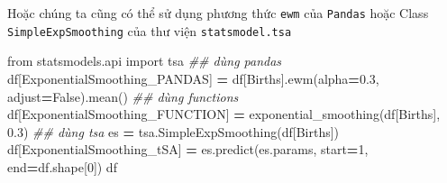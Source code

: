 \documentclass[
]{book}
\newenvironment{Shaded}{\begin{snugshade}}{\end{snugshade}}
\newcommand{\CommentTok}[1]{\textcolor[rgb]{0.56,0.35,0.01}{\textit{#1}}}
\newcommand{\DecValTok}[1]{\textcolor[rgb]{0.00,0.00,0.81}{#1}}
\newcommand{\FloatTok}[1]{\textcolor[rgb]{0.00,0.00,0.81}{#1}}
\newcommand{\ImportTok}[1]{#1}
\newcommand{\NormalTok}[1]{#1}
\newcommand{\OperatorTok}[1]{\textcolor[rgb]{0.81,0.36,0.00}{\textbf{#1}}}
\newcommand{\StringTok}[1]{\textcolor[rgb]{0.31,0.60,0.02}{#1}}
\newcommand{\VariableTok}[1]{\textcolor[rgb]{0.00,0.00,0.00}{#1}}
\begin{document}
Hoặc chúng ta cũng có thể sử dụng phương thức \texttt{ewm} của \texttt{Pandas} hoặc Class \texttt{SimpleExpSmoothing} của thư viện \texttt{statsmodel.tsa}

\begin{Shaded}
\begin{Highlighting}[]
\ImportTok{from}\NormalTok{ statsmodels.api }\ImportTok{import}\NormalTok{ tsa}
\CommentTok{\#\# dùng pandas}
\NormalTok{df[}\StringTok{\textquotesingle{}ExponentialSmoothing\_PANDAS\textquotesingle{}}\NormalTok{] }\OperatorTok{=}\NormalTok{ df[}\StringTok{\textquotesingle{}Births\textquotesingle{}}\NormalTok{].ewm(alpha}\OperatorTok{=}\FloatTok{0.3}\NormalTok{, adjust}\OperatorTok{=}\VariableTok{False}\NormalTok{).mean()}
\CommentTok{\#\# dùng functions}
\NormalTok{df[}\StringTok{\textquotesingle{}ExponentialSmoothing\_FUNCTION\textquotesingle{}}\NormalTok{] }\OperatorTok{=}\NormalTok{ exponential\_smoothing(df[}\StringTok{\textquotesingle{}Births\textquotesingle{}}\NormalTok{], }\FloatTok{0.3}\NormalTok{)}
\CommentTok{\#\# dùng tsa}
\NormalTok{es }\OperatorTok{=}\NormalTok{ tsa.SimpleExpSmoothing(df[}\StringTok{\textquotesingle{}Births\textquotesingle{}}\NormalTok{])}
\NormalTok{df[}\StringTok{\textquotesingle{}ExponentialSmoothing\_tSA\textquotesingle{}}\NormalTok{] }\OperatorTok{=}\NormalTok{ es.predict(es.params, start}\OperatorTok{=}\DecValTok{1}\NormalTok{, end}\OperatorTok{=}\NormalTok{df.shape[}\DecValTok{0}\NormalTok{])}
\NormalTok{df}
\end{Highlighting}
\end{Shaded}
\end{document}
